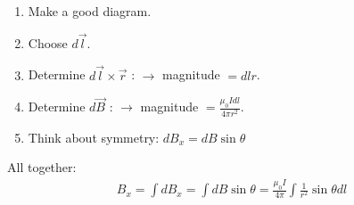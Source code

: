 \documentclass[aspectratio=169,
hyperref={colorlinks,urlcolor=blue}
]{beamer}
\begin{document}

{
\begin{enumerate}
\item Make a good diagram.
\item Choose $d\vec l$.
\item Determine $d \vec l\times \vec r$ : $\rightarrow$ magnitude  $=dl r$.
\item Determine $d\vec B$ : $\rightarrow$ magnitude $=\frac{\mu_0Idl}{4\pi r^2}$.
\item Think about symmetry: $dB_x=dB\sin\theta$
\end{enumerate}
All together:
\begin{align*}
B_x = \int dB_x = \int dB\sin\theta =  \frac{\mu_0I}{4\pi}\int \frac{1}{r^2}\sin\theta dl
\end{align*}
}
\end{document}
